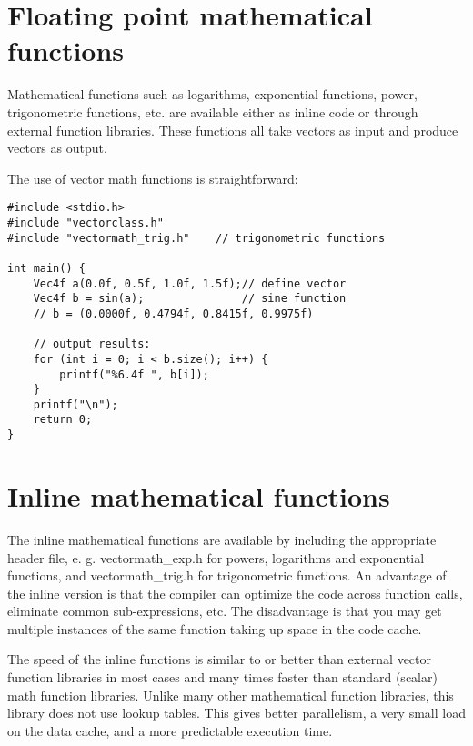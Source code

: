 \documentclass[vcl_manual.tex]{subfiles}
\begin{document}
\section{Floating point mathematical functions}\label{FPMathematicalFunctions}

Mathematical functions such as logarithms, exponential functions, power, trigonometric functions, etc. are available either as inline code or through external function libraries. These functions all take vectors as input and produce vectors as output.


The use of vector math functions is straightforward:
\begin{example}
\label{exampleSinFunction}
\end{example} %
\begin{lstlisting}[frame=single]
#include <stdio.h>
#include "vectorclass.h"
#include "vectormath_trig.h"    // trigonometric functions

int main() {
    Vec4f a(0.0f, 0.5f, 1.0f, 1.5f);// define vector
    Vec4f b = sin(a);               // sine function
    // b = (0.0000f, 0.4794f, 0.8415f, 0.9975f)

    // output results:
    for (int i = 0; i < b.size(); i++) {
        printf("%6.4f ", b[i]);
    }
    printf("\n");
    return 0;
}

\end{lstlisting}

\section{Inline mathematical functions}\label{InlineMathematicalFunctions}

The inline mathematical functions are available by including the appropriate header file, e. g. vectormath\_exp.h for powers, logarithms and exponential functions, and vectormath\_trig.h for trigonometric functions. An advantage of the inline version is that the compiler can optimize the code across function calls, eliminate common sub-expressions, etc. The disadvantage is that you may get multiple instances of the same function taking up space in the code cache.

The speed of the inline functions is similar to or better than external vector function libraries in most cases and many times faster than standard (scalar) math function libraries. 
Unlike many other mathematical function libraries, this library does not use lookup tables. This gives better parallelism, a very small load on the data cache, and a more predictable execution time.
\end{document}
